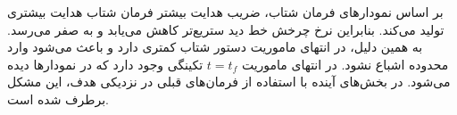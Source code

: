 بر اساس نمودارهای فرمان شتاب، ضریب هدایت بیشتر فرمان شتاب هدایت بیشتری تولید می‌کند. بنابراین نرخ چرخش خط دید ستریع‌تر کاهش می‌یابد و به صفر می‌رسد. به همین دلیل، در انتهای ماموریت دستور شتاب کمتری دارد و باعث می‌شود وارد محدوده اشباع نشود. در انتهای ماموریت $t= t_f$ تکینگی وجود دارد که در نمودارها دیده می‌شود. در بخش‌های آینده با استفاده از فرمان‌های قبلی در نزدیکی هدف، این مشکل برطرف شده است.